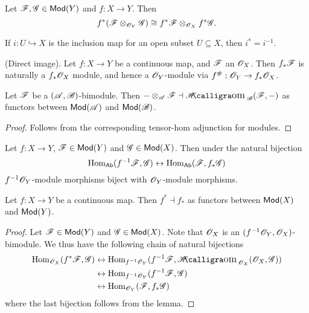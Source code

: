 \documentclass{memoir}
\begin{document}
\begin{thm}
    Let $\mathscr{F},\mathscr{G}\in {\normalfont\mathsf{Mod}}(Y)$ and $f:X\to Y$.
    Then 
    \begin{equation}
        f^*(\mathscr{F}\otimes_{\mathscr{O}_Y}\mathscr{G}) \cong f^*\mathscr{F}\otimes_{\mathscr{O}_X}f^*\mathscr{G}.
    \end{equation}
\end{thm}
\begin{remark}
    If $i:U\hookrightarrow X$ is the inclusion map for an open subset $U\subseteq X$, then $i^* = i^{-1}$.
\end{remark}
\begin{definition}
    (Direct image).
    Let $f:X\to Y$ be a continuous map, and $\mathscr{F}$ an $\mathscr{O}_X$.
    Then $f_*\mathscr{F}$ is naturally a $f_*\mathscr{O}_X$ module, and hence a $\mathscr{O}_Y$-module via $f^\#:\mathscr{O}_Y\to f_*\mathscr{O}_X$.
\end{definition}
\begin{thm}
    \label{thm:tensor-hom}
    Let $\mathscr{F}$ be a $(\mathscr{A},\mathscr{B})$-bimodule.
    Then $-\otimes_{\shf{A}}\shf{F}\dashv \sheafHom_{\shf{B}}(\shf{F},-)$ as functors between ${\normalfont\mathsf{Mod}}(\mathscr{A})$ and ${\normalfont\mathsf{Mod}}(\mathscr{B})$.
\end{thm}
\begin{proof}
    Follows from the corresponding tensor-hom adjunction for modules.
\end{proof}
\begin{lemma}
    Let $f:X\to Y$, $\mathscr{F}\in {\normalfont\mathsf{Mod}}(Y)$ and $\mathscr{G}\in {\normalfont\mathsf{Mod}}(X)$.
    Then under the natural bijection
    \begin{equation}
        \operatorname{Hom}_{\normalfont\mathsf{Ab}}(f^{-1}\mathscr{F},\mathscr{G}) \leftrightarrow \operatorname{Hom}_{\normalfont\mathsf{Ab}}(\mathscr{F},f_*\mathscr{G})
    \end{equation}
    $f^{-1}\mathscr{O}_Y$-module morphisms biject with $\mathscr{O}_Y$-module morphisms.
\end{lemma}
\begin{thm}
    Let $f:X\to Y$ be a continuous map. 
    Then $f^*\dashv f_*$ as functors between ${\normalfont\mathsf{Mod}}(X)$ and ${\normalfont\mathsf{Mod}}(Y)$.
\end{thm}
\begin{proof}
    Let $\mathscr{F}\in {\normalfont\mathsf{Mod}}(Y)$ and $\mathscr{G}\in {\normalfont\mathsf{Mod}}(X)$.
    Note that $\mathscr{O}_X$ is an $(f^{-1}\mathscr{O}_Y,\mathscr{O}_X)$-bimodule.
    We thus have the following chain of natural bijections
    \begin{align}
        \Hom_{\shf{O}_X}(f^*\shf{F},\shf{G}) &\leftrightarrow \Hom_{f^{-1}\shf{O}_Y}(f^{-1}\shf{F},\sheafHom_{\shf{O}_X}(\shf{O}_X,\shf{G})) \nonumber \\
                                             &\leftrightarrow \Hom_{f^{-1}\shf{O}_Y}(f^{-1}\shf{F},\shf{G}) \nonumber \\
                                             &\leftrightarrow \Hom_{\shf{O}_Y}(\shf{F},f_*\shf{G})
    \end{align}
    where the last bijection follows from the lemma.
\end{proof}
\end{document}
